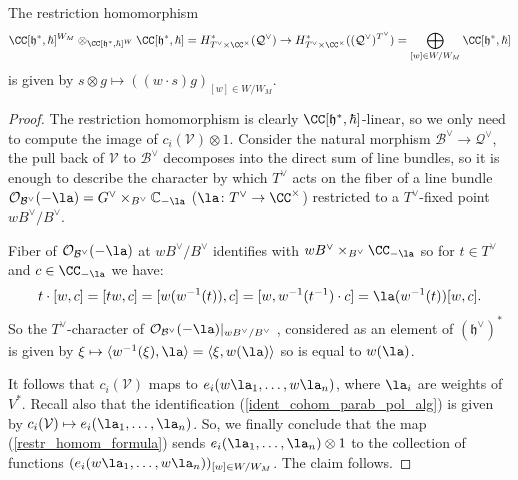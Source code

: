 \documentclass[12pt]{amsart}
\newcommand{\CO}{\mathcal{O}}
\begin{document}
\begin{lemma}\label{restriction_fixed_point_parabolic}
The restriction homomorphism 
\begin{equation}\label{restr_homom_formula}
\CC[\mathfrak{h}^*,\hbar]^{W_M} \otimes_{\CC[\mathfrak{h}^*,\hbar]^W} \CC[\mathfrak{h}^*,\hbar]=H^*_{T^\vee \times \CC^\times}(\mathcal{Q}^\vee) \rightarrow H^*_{T^{\vee} \times \CC^\times}((\mathcal{Q}^\vee)^{T^{\vee}})=\bigoplus_{[w] \in W/W_{M}}\CC[\mathfrak{h}^*,\hbar]
\end{equation}
is given by $s \otimes g \mapsto ((w \cdot s)g)_{[w] \in W/W_M}$.
\end{lemma}
\begin{proof}
The restriction homomorphism is clearly $\CC[\mathfrak{h}^*,\hbar]$-linear, so we only need to compute the image of $c_i(\mathcal{V}) \otimes 1$. Consider the natural morphism $\mathcal{B}^\vee \rightarrow \mathcal{Q}^\vee$,
the pull back of $\mathcal{V}$ to $\mathcal{B}^\vee$ decomposes into the direct sum of line bundles, so it is enough to describe the character by which $T^\vee$ acts on the fiber of a line bundle $\mathcal{O}_{\mathcal{B}^\vee}(-\la)=G^\vee \times_{B^{\vee}} \mathbb{C}_{-\la}$ ($\la\colon T^\vee \rightarrow \CC^\times$) restricted to a  $T^\vee$-fixed point $wB^\vee/B^\vee$.


Fiber of $\CO_{\mathcal{B}^\vee}(-\la)$ at $wB^\vee/B^\vee$ identifies with  $wB^\vee \times_{B^\vee} \CC_{-\la}$ so for $t \in T^\vee$ and $c \in \CC_{-\la}$ we have: 
\begin{equation*}
t \cdot [w,c]=[tw,c]=[w(w^{-1}(t)),c]=[w,w^{-1}(t^{-1})\cdot c]=\la(w^{-1}(t))[w,c].
\end{equation*}
So the $T^\vee$-character of $\CO_{\mathcal{B}^\vee}(-\la)|_{wB^\vee/B^\vee}$ , considered as an element of $(\mathfrak{h}^\vee)^*$ is given by $\xi \mapsto \langle w^{-1}(\xi),\la\rangle=\langle \xi,w(\la)\rangle$ so is equal to $w(\la)$. 

It follows that $c_i(\mathcal{V})$ maps to $e_i(w\la_1,\ldots,w\la_n)$, where $\la_i$ are weights of $V^*$. Recall also that the identification (\ref{ident_cohom_parab_pol_alg}) is given by $c_i(\mathcal{V}) \mapsto e_i(\la_1,\ldots,\la_n)$. So, we finally conclude that the map (\ref{restr_homom_formula}) sends $e_i(\la_1,\ldots,\la_n) \otimes 1$ to the collection of functions $(e_i(w\la_1,\ldots,w\la_n))_{[w] \in W/W_M}$. The claim follows.
\end{proof}
\end{document}
